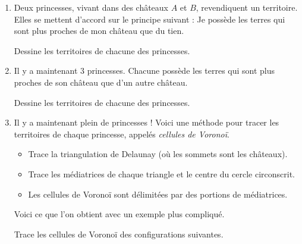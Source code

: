 \documentclass[class=report,crop=false, 12pt]{standalone}
\begin{document}
\begin{activite}

\sauteligne

\begin{enumerate}
  \item Deux princesses, vivant dans des châteaux $A$ et $B$, revendiquent un territoire. Elles se mettent d'accord sur le principe suivant : \og Je possède les terres qui sont plus proches de mon château que du tien. \fg{}

Dessine les territoires de chacune des princesses.

  \item Il y a maintenant $3$ princesses. Chacune possède les terres qui sont plus proches de son château que d'un autre château.
  

Dessine les territoires de chacune des princesses.
  
  \item Il y a maintenant plein de princesses !
  Voici une méthode pour tracer les territoires de chaque princesse, appelés \emph{cellules de Voronoï}. 
  \begin{itemize}
    \item Trace la triangulation de Delaunay (où les sommets sont les châteaux).
    \item Trace les médiatrices de chaque triangle et le centre du cercle circonscrit.
    \item Les cellules de Voronoï sont délimitées par des portions de médiatrices.
  \end{itemize}

 
 
  
Voici ce que l'on obtient avec un exemple plus compliqué.
  
Trace les cellules de Voronoï des configurations suivantes.

  
  
 
 
\end{enumerate}

\end{activite}
\end{document}
